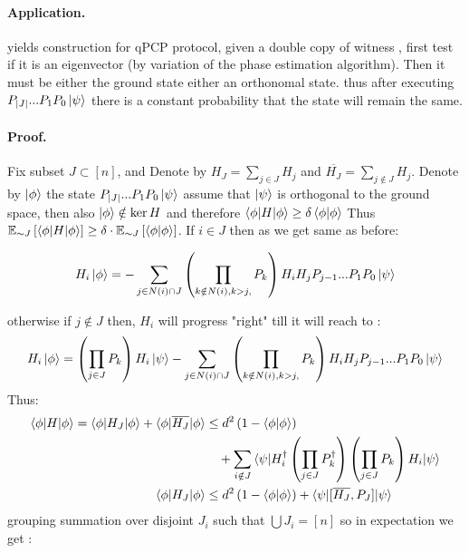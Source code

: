 \paragraph{Application.} yields construction for qPCP protocol, given a double copy of witness \tstate, first test if it is an eigenvector (by variation of the phase estimation algorithm). Then it must be either the ground state either an orthonomal state. thus after executing \(\PPj{P_{|J|}}\) there is a constant probability that the state will remain the same.    

\paragraph{Proof.} Fix subset \(J \subset [n] \), and Denote by \(H_J = \sum_{j \in J} H_j  \) and \( \overline{H_J} = \sum_{j\notin J}H_j\).   Denote by \( \ket{\phi}\) the state \( \PPj{P_{|J|}} \) assume that \( \ket{\psi} \) is orthogonal to the ground space, then also \( \ket{\phi} \notin \ker H \) and therefore \( \Obs{\phi}{H} \ge \delta \braket{\phi|\phi} \) Thus \( \Exp{\braket{\phi|H|\phi}}{\sim J} \ge \delta \cdot \Exp{ \braket{\phi|\phi}}{\sim J} \). 
If \(i \in J\) then as we get same as before:

\[\begin{split}
    H_i\ket{\phi} = -\sum_{j\in N(i) \cap J } \left( \prod_{k\notin N(i), k > j, }{P_k} \right) \PPj{H_{i}H_{j}P_{j-1}}
\end{split}
\]

otherwise if \( j \notin J\) then, \(H_i\) will progress "right" till it will reach to \tstate : 
\[\begin{split}
    H_i\ket{\phi} = \left( \prod_{j\in J}{P_k} \right) H_i \ket{\psi} -\sum_{j\in N(i) \cap J } \left( \prod_{k\notin N(i), k > j, }{P_k} \right) \PPj{H_{i}H_{j}P_{j-1}}
\end{split}
\]
Thus:
\[\begin{split}
 \Obs{\phi}{H} = \Obs{\phi}{H_J} + \Obs{\phi}{\overline{H_J}} & \le d^2\left(1-  \braket{\phi|\phi}\right)  \\ & \ \ \ + \sum_{i\notin J}\braket{\psi| H_{i}^{\dagger} \left( \prod_{j\in J}{P_{k}^{\dagger}} \right)\left( \prod_{j\in J}{P_{k}} \right) H_i |\psi}   \\ 
 \Obs{\phi}{H_J} & \le d^2\left(1 - \braket{\phi|\phi}\right) + \Obs{\psi}{[\overline{H_J},P_J]}   
\end{split}
\]
grouping summation over disjoint \( J_i \) such that \( \bigcup J_i = [n] \) so in expectation we get :

